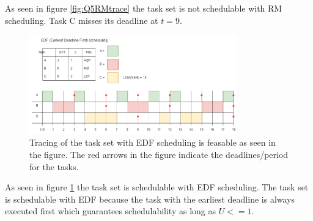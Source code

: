     As seen in figure \ref{fig:Q5RMtrace} the task set is not schedulable with RM scheduling. Task C misses its deadline at $t = 9$.\\

    \begin{figure}[H]
        \centering
        \includegraphics[width=0.8\textwidth]{images/Ass1Q5EDF.drawio.png}
        \caption{Tracing of the task set with EDF scheduling is feasable as seen in the figure. The red arrows in the figure indicate the deadlines/period for the tasks.}
        \label{fig:Q5EDFtrace}
    \end{figure}
        
    As seen in figure \ref{fig:Q5EDFtrace} the task set is schedulable with EDF scheduling. The task set is schedulable with EDF because the task with the earliest deadline is always executed first which guarantees schedulability as long as $U <= 1$.\\